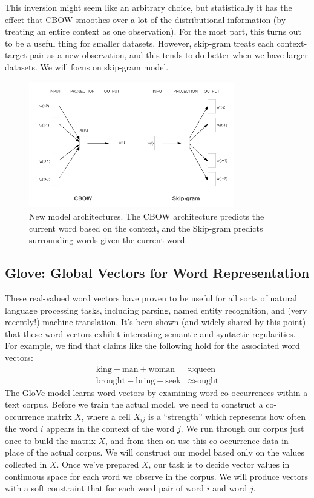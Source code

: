 This inversion might seem like an arbitrary choice, but statistically it has the effect that CBOW smoothes over a lot of the distributional information (by treating an entire context as one observation). For the most part, this turns out to be a useful thing for smaller datasets. However, skip-gram treats each context-target pair as a new observation, and this tends to do better when we have larger datasets. We will focus on skip-gram model.

 \begin{figure}[H]%
     \center%
     \includegraphics[width=0.8\textwidth]{images/cbow+skip.PNG}%
     \caption[cbow and skip Models]{New model architectures. The CBOW architecture predicts the current word based on the context, and the Skip-gram predicts surrounding words given the current word.}\label{fig:cbow}%
 \end{figure}
 \subsection{Glove: Global Vectors for Word Representation}
These real-valued word vectors have proven to be useful for all sorts of natural language processing tasks, including parsing, named entity recognition, and (very recently!) machine translation\cite{pennington2014glove}.
It’s been shown (and widely shared by this point) that these word vectors exhibit interesting semantic and syntactic regularities. For example, we find that claims like the following hold for the associated word vectors:
 \begin{align*}\text{king} - \text{man} + \text{woman} &\approx \text{queen} \\ \text{brought} - \text{bring} + \text{seek} &\approx \text{sought}\end{align*}
 The GloVe model learns word vectors by examining word co-occurrences within a text corpus. Before we train the actual model, we need to construct a co-occurrence matrix $X$, where a cell $X_{ij}$ is a “strength” which represents how often the word $i$ appears in the context of the word $j$. We run through our corpus just once to build the matrix $X$, and from then on use this co-occurrence data in place of the actual corpus. We will construct our model based only on the values collected in $X$.
Once we’ve prepared $X$, our task is to decide vector values in continuous space for each word we observe in the corpus. We will produce vectors with a soft constraint that for each word pair of word $i$ and word $j$.

